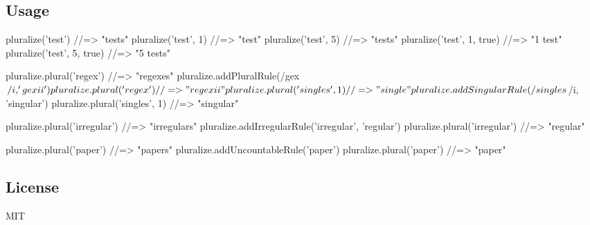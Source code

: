 \subsection*{Usage}


\begin{DoxyCode}
pluralize('test') //=> "tests"
pluralize('test', 1) //=> "test"
pluralize('test', 5) //=> "tests"
pluralize('test', 1, true) //=> "1 test"
pluralize('test', 5, true) //=> "5 tests"

pluralize.plural('regex') //=> "regexes"
pluralize.addPluralRule(/gex$/i, 'gexii')
pluralize.plural('regex') //=> "regexii"

pluralize.plural('singles', 1) //=> "single"
pluralize.addSingularRule(/singles$/i, 'singular')
pluralize.plural('singles', 1) //=> "singular"

pluralize.plural('irregular') //=> "irregulars"
pluralize.addIrregularRule('irregular', 'regular')
pluralize.plural('irregular') //=> "regular"

pluralize.plural('paper') //=> "papers"
pluralize.addUncountableRule('paper')
pluralize.plural('paper') //=> "paper"
\end{DoxyCode}


\subsection*{License}

M\+IT 